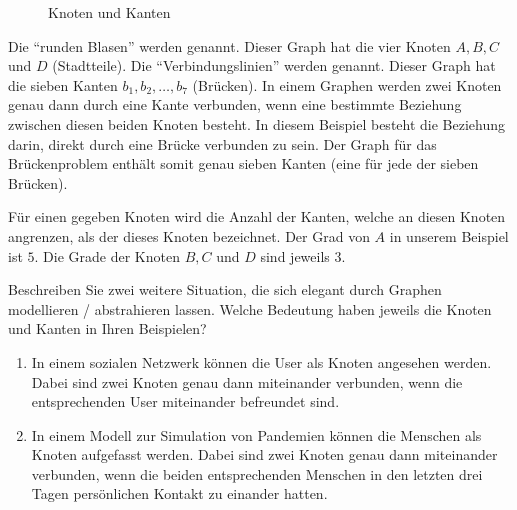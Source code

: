 \begin{figure}[H]
\centering
{}
\caption{Knoten und Kanten}
\label{fig:kanten}
\end{figure}

\noindent
Die \enquote{runden Blasen} werden \tib{\textcolor{Red}{Knoten}} genannt. Dieser Graph hat die vier Knoten $A, B, C$ und $D$ (Stadtteile). Die \enquote{Verbindungslinien} werden \tib{\textcolor{Blue}{Kanten}} genannt. Dieser Graph hat die sieben Kanten $b_1,b_2, \ldots, b_7$ (Brücken). In einem Graphen werden zwei Knoten genau dann durch eine Kante verbunden, wenn eine bestimmte Beziehung zwischen diesen beiden Knoten besteht. In diesem Beispiel besteht die Beziehung darin, direkt durch eine Brücke verbunden zu sein. Der Graph für das Brückenproblem enthält somit genau sieben Kanten (eine für jede der sieben Brücken).

Für einen gegeben Knoten wird die Anzahl der Kanten, welche an diesen Knoten angrenzen, als der  dieses Knoten bezeichnet. Der Grad von $A$ in unserem Beispiel ist $5$. Die Grade der Knoten $B, C$ und $D$ sind jeweils $3$.

\begin{myexercise}\label{aufgabe:01}
Beschreiben Sie zwei weitere Situation, die sich elegant durch Graphen modellieren / abstrahieren lassen.
Welche Bedeutung haben jeweils die Knoten und Kanten in Ihren Beispielen?
\begin{myanswer}\label{aufgabe:01-sol}
\begin{enumerate}
    \item In einem sozialen Netzwerk können die User als Knoten angesehen werden. Dabei sind zwei Knoten genau dann miteinander verbunden, wenn die entsprechenden User miteinander befreundet sind.
    \item In einem Modell zur Simulation von Pandemien können die Menschen als Knoten aufgefasst werden. Dabei sind zwei Knoten genau dann miteinander verbunden, wenn die beiden entsprechenden Menschen in den letzten drei Tagen persönlichen Kontakt zu einander hatten.
\end{enumerate}
\end{myanswer}
\end{myexercise}

